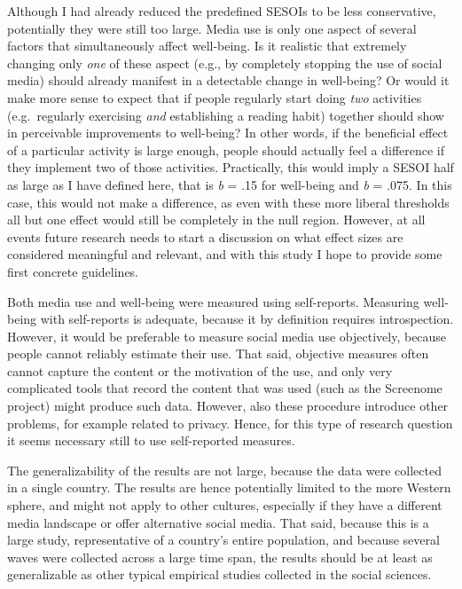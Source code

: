 \documentclass[
  english,
  man,mask,floatsintext]{apa6}
\begin{document}
Although I had already reduced the predefined SESOIs to be less conservative, potentially they were still too large.
Media use is only one aspect of several factors that simultaneously affect well-being.
Is it realistic that extremely changing only \emph{one} of these aspect (e.g., by completely stopping the use of social media) should already manifest in a detectable change in well-being?
Or would it make more sense to expect that if people regularly start doing \emph{two} activities (e.g.~regularly exercising \emph{and} establishing a reading habit) together should show in perceivable improvements to well-being?
In other words, if the beneficial effect of a particular activity is large enough, people should actually feel a difference if they implement two of those activities.
Practically, this would imply a SESOI half as large as I have defined here, that is \emph{b} = \textbar.15\textbar{} for well-being and \emph{b} = \textbar.075\textbar.
In this case, this would not make a difference, as even with these more liberal thresholds all but one effect would still be completely in the null region.
However, at all events future research needs to start a discussion on what effect sizes are considered meaningful and relevant, and with this study I hope to provide some first concrete guidelines.

Both media use and well-being were measured using self-reports.
Measuring well-being with self-reports is adequate, because it by definition requires introspection.
However, it would be preferable to measure social media use objectively, because people cannot reliably estimate their use.
That said, objective measures often cannot capture the content or the motivation of the use, and only very complicated tools that record the content that was used (such as the Screenome project) might produce such data.
However, also these procedure introduce other problems, for example related to privacy.
Hence, for this type of research question it seems necessary still to use self-reported measures.

The generalizability of the results are not large, because the data were collected in a single country.
The results are hence potentially limited to the more Western sphere, and might not apply to other cultures, especially if they have a different media landscape or offer alternative social media.
That said, because this is a large study, representative of a country's entire population, and because several waves were collected across a large time span, the results should be at least as generalizable as other typical empirical studies collected in the social sciences.
\end{document}
